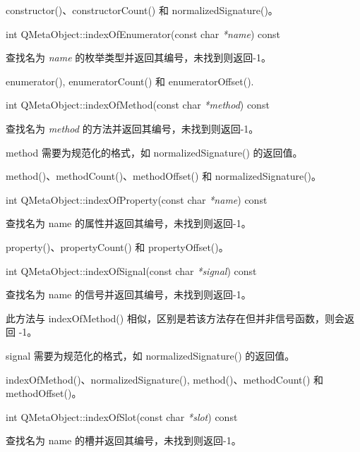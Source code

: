 \begin{notice}[另请参阅]
constructor()、constructorCount() 和 normalizedSignature()。
\end{notice}

int QMetaObject::indexOfEnumerator(const char \emph{*name}) const

查找名为 \emph{name} 的枚举类型并返回其编号，未找到则返回-1。

\begin{notice}
enumerator(), enumeratorCount() 和 enumeratorOffset().
\end{notice}

int QMetaObject::indexOfMethod(const char \emph{*method}) const

查找名为 \emph{method} 的方法并返回其编号，未找到则返回-1。

\begin{notice}
method 需要为规范化的格式，如 normalizedSignature() 的返回值。
\end{notice}

\begin{notice}[另请参阅]
method()、methodCount()、methodOffset() 和 normalizedSignature()。
\end{notice}

int QMetaObject::indexOfProperty(const char \emph{*name}) const

查找名为 name 的属性并返回其编号，未找到则返回-1。

\begin{notice}[另请参阅]
property()、propertyCount() 和 propertyOffset()。	
\end{notice}

int QMetaObject::indexOfSignal(const char \emph{*signal}) const

查找名为 name 的信号并返回其编号，未找到则返回-1。

此方法与 indexOfMethod() 相似，区别是若该方法存在但并非信号函数，则会返回 -1。

\begin{notice}
signal 需要为规范化的格式，如 normalizedSignature() 的返回值。	
\end{notice}

\begin{notice}[另请参阅]
indexOfMethod()、normalizedSignature(), method()、methodCount() 和 methodOffset()。
\end{notice}

int QMetaObject::indexOfSlot(const char \emph{*slot}) const

查找名为 name 的槽并返回其编号，未找到则返回-1。

